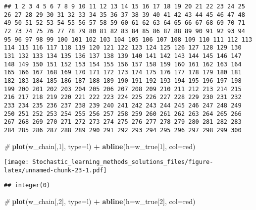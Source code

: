 \documentclass[
]{article}
\newenvironment{Shaded}{\begin{snugshade}}{\end{snugshade}}
\newcommand{\CommentTok}[1]{\textcolor[rgb]{0.56,0.35,0.01}{\textit{#1}}}
\newcommand{\DataTypeTok}[1]{\textcolor[rgb]{0.13,0.29,0.53}{#1}}
\newcommand{\DecValTok}[1]{\textcolor[rgb]{0.00,0.00,0.81}{#1}}
\newcommand{\KeywordTok}[1]{\textcolor[rgb]{0.13,0.29,0.53}{\textbf{#1}}}
\newcommand{\NormalTok}[1]{#1}
\newcommand{\OperatorTok}[1]{\textcolor[rgb]{0.81,0.36,0.00}{\textbf{#1}}}
\newcommand{\StringTok}[1]{\textcolor[rgb]{0.31,0.60,0.02}{#1}}
\begin{document}
\begin{verbatim}
## 1 2 3 4 5 6 7 8 9 10 11 12 13 14 15 16 17 18 19 20 21 22 23 24 25 26 27 28 29 30 31 32 33 34 35 36 37 38 39 40 41 42 43 44 45 46 47 48 49 50 51 52 53 54 55 56 57 58 59 60 61 62 63 64 65 66 67 68 69 70 71 72 73 74 75 76 77 78 79 80 81 82 83 84 85 86 87 88 89 90 91 92 93 94 95 96 97 98 99 100 101 102 103 104 105 106 107 108 109 110 111 112 113 114 115 116 117 118 119 120 121 122 123 124 125 126 127 128 129 130 131 132 133 134 135 136 137 138 139 140 141 142 143 144 145 146 147 148 149 150 151 152 153 154 155 156 157 158 159 160 161 162 163 164 165 166 167 168 169 170 171 172 173 174 175 176 177 178 179 180 181 182 183 184 185 186 187 188 189 190 191 192 193 194 195 196 197 198 199 200 201 202 203 204 205 206 207 208 209 210 211 212 213 214 215 216 217 218 219 220 221 222 223 224 225 226 227 228 229 230 231 232 233 234 235 236 237 238 239 240 241 242 243 244 245 246 247 248 249 250 251 252 253 254 255 256 257 258 259 260 261 262 263 264 265 266 267 268 269 270 271 272 273 274 275 276 277 278 279 280 281 282 283 284 285 286 287 288 289 290 291 292 293 294 295 296 297 298 299 300
\end{verbatim}

\begin{Shaded}
\begin{Highlighting}[]
\CommentTok{\#}
\KeywordTok{plot}\NormalTok{(w\_chain[,}\DecValTok{1}\NormalTok{], }\DataTypeTok{type=}\StringTok{\textquotesingle{}l\textquotesingle{}}\NormalTok{) }\OperatorTok{+}
\KeywordTok{abline}\NormalTok{(}\DataTypeTok{h=}\NormalTok{w\_true[}\DecValTok{1}\NormalTok{], }\DataTypeTok{col=}\StringTok{\textquotesingle{}red\textquotesingle{}}\NormalTok{)}
\end{Highlighting}
\end{Shaded}

\texttt{[image: Stochastic\_learning\_methods\_solutions\_files/figure-latex/unnamed-chunk-23-1.pdf]}

\begin{verbatim}
## integer(0)
\end{verbatim}

\begin{Shaded}
\begin{Highlighting}[]
\CommentTok{\#}
\KeywordTok{plot}\NormalTok{(w\_chain[,}\DecValTok{2}\NormalTok{], }\DataTypeTok{type=}\StringTok{\textquotesingle{}l\textquotesingle{}}\NormalTok{) }\OperatorTok{+}
\KeywordTok{abline}\NormalTok{(}\DataTypeTok{h=}\NormalTok{w\_true[}\DecValTok{2}\NormalTok{], }\DataTypeTok{col=}\StringTok{\textquotesingle{}red\textquotesingle{}}\NormalTok{)}
\end{Highlighting}
\end{Shaded}
\end{document}
